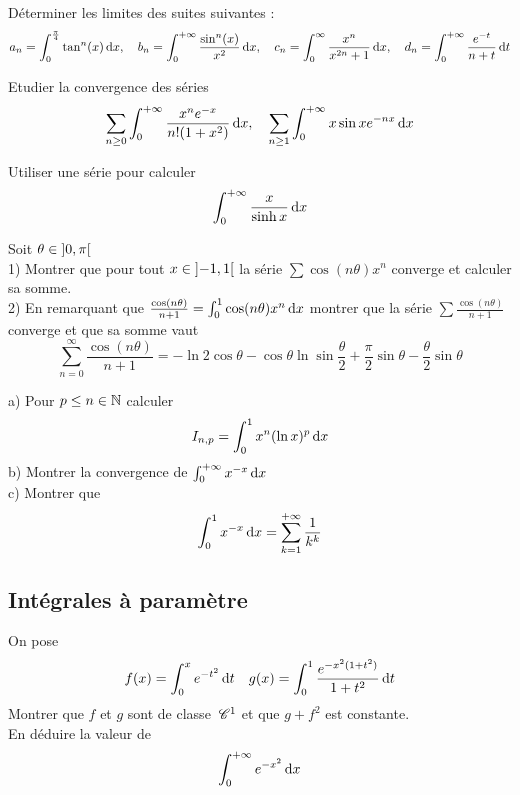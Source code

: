\begin{exercice}
Déterminer les limites des suites suivantes :
$$ a_{n}=\int_{0}^{\frac{\pi}{4}}\tan^{n}(x)\,\mathrm{d}x, \quad b_{n}=\int_{0}^{+\infty}\frac{\sin^{n}(x)}{x^{2}}\,\mathrm{d}x, \quad c_{n}=\int_{0}^{\infty}\frac{x^{n}}{x^{2n}+1}\,\mathrm{d}x, \quad d_n = \int_{0}^{+\infty}\frac{e^{-t}}{n+t}\,\mathrm{d}t $$
\end{exercice}

\begin{exercice}
Etudier la convergence des séries
$$ \sum_{n\ge 0}\int_{0}^{+\infty}\frac{x^{n}e^{-x}}{n!(1+x^{2})}\,\mathrm{d}x, \quad \sum_{n\ge 1}\int_{0}^{+\infty}x \sin x e^{-nx}\,\mathrm{d}x $$
\end{exercice}

\begin{exercice}
Utiliser une série pour calculer
$$ \int_{0}^{+\infty}\frac{x}{\sinh x}\,\mathrm{d}x $$
\end{exercice}

\begin{exercice}
Soit $\theta\in\left]0, \pi\right[$ \\
1) Montrer que pour tout $x\in\left]-1, 1\right[$ la série $\sum \cos(n\theta)x^{n}$ converge et calculer sa somme. \\
2) En remarquant que $\frac{\cos(n\theta)}{n+1}=\int_{0}^{1}\cos(n\theta)x^{n}\,\mathrm{d}x$ montrer que la série $\sum\frac{\cos(n\theta)}{n+1}$ converge et que sa somme vaut
$$ \sum_{n=0}^{\infty}\frac{\cos(n\theta)}{n+1} = -\ln 2 \cos \theta - \cos \theta \ln \sin\frac{\theta}{2} + \frac{\pi}{2}\sin \theta - \frac{\theta}{2}\sin \theta $$
\end{exercice}

\begin{exercice}
a) Pour $p\le n\in\mathbb{N}$ calculer
$$ I_{n,p}=\int_{0}^{1}x^{n}(\ln x)^{p}\,\mathrm{d}x $$
b) Montrer la convergence de $\int_{0}^{+\infty}x^{-x}\,\mathrm{d}x$ \\
c) Montrer que
$$ \int_{0}^{1}x^{-x}\,\mathrm{d}x = \sum_{k=1}^{+\infty}\frac{1}{k^{k}} $$
\end{exercice}

\subsection{Intégrales à paramètre}

\begin{exercice}
On pose
$$ f(x)=\int_{0}^{x}e^{-t^{2}}\,\mathrm{d}t \quad g(x)=\int_{0}^{1}\frac{e^{-x^{2}(1+t^{2})}}{1+t^{2}}\,\mathrm{d}t $$
Montrer que $f$ et $g$ sont de classe $\,\mathscr C^{1}$ et que $g+f^{2}$ est constante. \\
En déduire la valeur de
$$ \int_{0}^{+\infty}e^{-x^{2}}\,\mathrm{d}x $$
\end{exercice}

